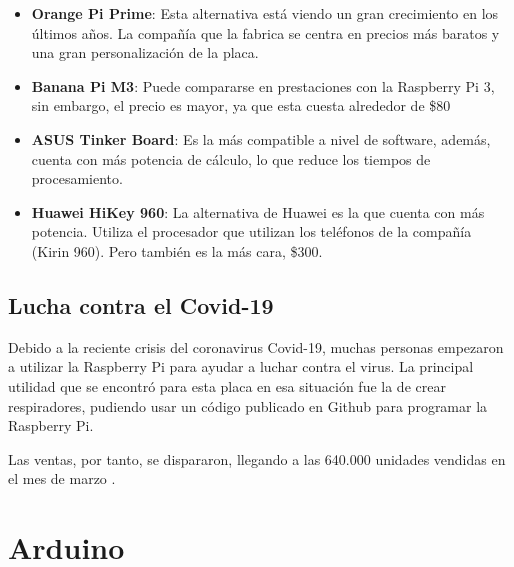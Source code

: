             \begin{itemize}
                \item \textbf{Orange Pi Prime}: Esta alternativa está viendo un gran crecimiento en los últimos años. La
                compañía que la fabrica se centra en precios más baratos y una gran personalización de la placa.
                \item \textbf{Banana Pi M3}: Puede compararse en prestaciones con la Raspberry Pi 3, sin embargo, el
                precio es mayor, ya que esta cuesta alrededor de \$80
                \item \textbf{ ASUS Tinker Board}: Es la más compatible a nivel de software, además, cuenta con más
                potencia de cálculo, lo que reduce los tiempos de procesamiento.
                \item \textbf{Huawei HiKey 960}: La alternativa de Huawei es la que cuenta con más potencia. Utiliza el
                procesador que utilizan los teléfonos de la compañía (Kirin 960). Pero también es la más cara, \$300.
            \end{itemize}
        

        \subsection{Lucha contra el Covid-19} %
        \label{sub:LuchaContraElCovid-19}

            Debido a la reciente crisis del coronavirus Covid-19, muchas personas empezaron a utilizar la Raspberry Pi
            para ayudar a luchar contra el virus. La principal utilidad que se encontró para esta placa en esa situación
            fue la de crear respiradores, pudiendo usar un código publicado en Github \cite{github_respirador} para
            programar la Raspberry Pi.

            Las ventas, por tanto, se dispararon, llegando a las 640.000 unidades vendidas en el mes de
            marzo \cite{ventas_raspberry_pi_covid}.
        


    \section{Arduino} %
    \label{sec:Arduino}

